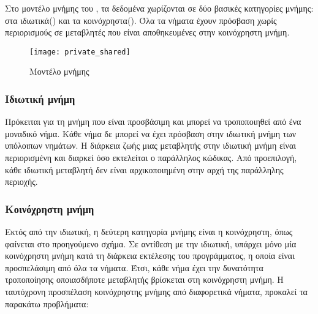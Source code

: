 Στο μοντέλο μνήμης του , τα δεδομένα χωρίζονται σε δύο βασικές κατηγορίες μνήμης: στα
ιδιωτικά(\emph{}) και τα κοινόχρηστα(\emph{}).  Όλα τα νήματα έχουν πρόσβαση
χωρίς περιορισμούς σε μεταβλητές που είναι αποθηκευμένες στην κοινόχρηστη μνήμη\cite{thenextstep7}.

\begin{center}
\begin{figure}[h]
\texttt{[image: private\_shared]}
\captionsetup{justification=centering, singlelinecheck=false}
\caption{Μοντέλο μνήμης }
\label{fig:private_shared}
\end{figure}
\end{center}

\subsubsection{Ιδιωτική μνήμη}
Πρόκειται για τη μνήμη που είναι προσβάσιμη και μπορεί να τροποποιηθεί από ένα μοναδικό νήμα. Κάθε
νήμα δε μπορεί να έχει πρόσβαση στην ιδιωτική μνήμη των υπόλοιπων νημάτων. Η διάρκεια ζωής μιας
μεταβλητής στην ιδιωτική μνήμη είναι περιορισμένη και διαρκεί όσο εκτελείται ο παράλληλος κώδικας.
Από προεπιλογή, κάθε ιδιωτική μεταβλητή δεν είναι αρχικοποιημένη στην αρχή της παράλληλης
περιοχής\cite{thenextstep9}.
\clearpage
\subsubsection{Κοινόχρηστη μνήμη}
Εκτός από την ιδιωτική, η δεύτερη κατηγορία μνήμης είναι η κοινόχρηστη, όπως φαίνεται στο προηγούμενο σχήμα. Σε αντίθεση με την ιδιωτική, υπάρχει μόνο μία κοινόχρηστη μνήμη κατά τη διάρκεια
εκτέλεσης του προγράμματος, η οποία είναι προσπελάσιμη από όλα τα νήματα. Έτσι, κάθε νήμα έχει την
δυνατότητα τροποποίησης οποιασδήποτε μεταβλητής βρίσκεται στη κοινόχρηστη μνήμη. Η ταυτόχρονη
προσπέλαση κοινόχρηστης μνήμης από διαφορετικά νήματα, προκαλεί τα παρακάτω προβλήματα:

